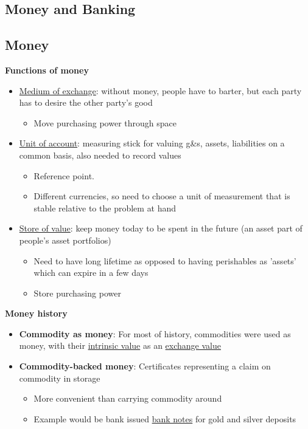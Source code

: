 \documentclass{article}
\begin{document}
\begin{multicols}{2}
\section{Money and Banking}
\subsection{Money}
\textbf{Functions of money}
\begin{itemize}
	\item \underline{Medium of exchange}: without money, people have to barter, but each party has to desire the other party's good
	\begin{itemize}
		\item Move purchasing power through space
	\end{itemize}
	\item \underline{Unit of account}: measuring stick for valuing g\&s, assets, liabilities on a common basis, also needed to record values
	\begin{itemize}
		\item Reference point.
		\item Different currencies, so need to choose a unit of measurement that is stable relative to the problem at hand
	\end{itemize}
	\item \underline{Store of value}: keep money today to be spent in the future (an asset part of people's asset portfolios)
	\begin{itemize}
		\item Need to have long lifetime as opposed to having perishables as 'assets' which can expire in a few days
		\item Store purchasing power
	\end{itemize}
\end{itemize}
\textbf{Money history}
\begin{itemize}
	\item \textbf{Commodity as money}: For most of history, commodities were used as money, with their \underline{intrinsic value} as an \underline{exchange value}
	\item \textbf{Commodity-backed money}: Certificates representing a claim on commodity in storage
	\begin{itemize}
		\item More convenient than carrying commodity around
		\item Example would be bank issued \underline{bank notes} for gold and silver deposits
	\end{itemize}

\end{itemize}
\end{multicols}
\end{document}
